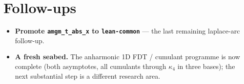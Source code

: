 \documentclass[11pt]{article}
\begin{document}
\section{Follow-ups}

\begin{itemize}[itemsep=3pt]
\item \textbf{Promote \texttt{amgm\_t\_abs\_x} to \texttt{lean-common}} --- the
  last remaining laplace-arc follow-up.
\item \textbf{A fresh seabed.} The anharmonic 1D FDT / cumulant programme is now
  complete (both asymptotes, all cumulants through $\kappa_4$ in three bases);
  the next substantial step is a different research area.
\end{itemize}
\end{document}
